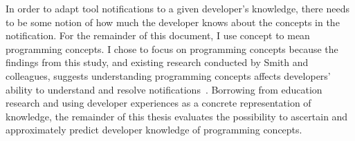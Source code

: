 In order to adapt tool notifications to a given developer's knowledge, there needs to be some notion of how much the developer knows about the concepts in the notification. For the remainder of this document, I use concept to mean programming concepts. I chose to focus on programming concepts because the findings from this study, and existing research conducted by Smith and colleagues, suggests understanding programming concepts affects developers' ability to understand and resolve notifications~\cite{smith2015questions}. Borrowing from education research and using developer experiences as a concrete representation of knowledge, the remainder of this thesis evaluates the possibility to ascertain and approximately predict developer knowledge of programming concepts.
